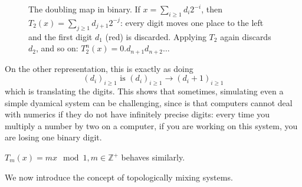 \begin{example}[of map]
\begin{figure}[ht]
    \caption{The doubling map in binary. If $x=\sum_{i\ge1}d_i2^{-i}$, then $T_2(x)=\sum_{j\ge1}d_{j+1}2^{-j}$:
    every digit moves one place to the left and the first digit $d_1$ (red) is discarded.
    Applying $T_2$ again discards $d_2$, and so on: $T_2^n(x)=0.d_{n+1}d_{n+2}\dots$}
    \label{fig:doubling_shift}
\end{figure}
    
    On the other representation, this is exactly as doing \begin{equation*}
        (d_i)_{i\geq 1}\text{ is }(d_i)_{i\geq 1}\rightarrow(d_i+1)_{i\geq 1}
    \end{equation*}
    which is translating the digits.  This shows that sometimes, simulating even a simple dyamical system can be challenging, since is that computers cannot deal with numerics if they do not have infinitely precise digits: every time you multiply a number by two on a computer, if you are working on this system, you are losing one binary digit.

    $T_m(x)=mx \mod 1, m\in\mathbb{Z}^+$ behaves similarly.
\end{example}

We now introduce the concept of topologically mixing systems.

